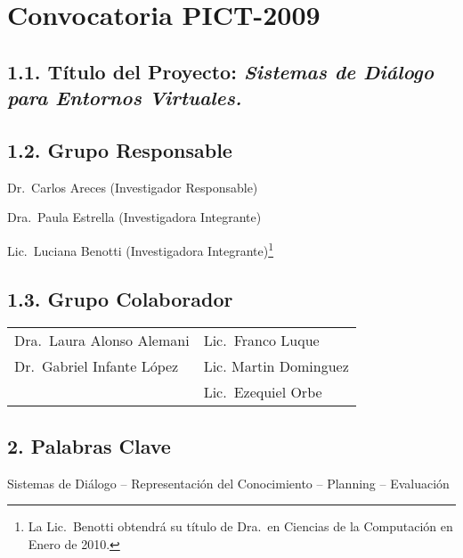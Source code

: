 \documentclass[11pt]{article}
\newcommand{\MySubSection}[1]{\vspace*{-.1\baselineskip}%
\subsection*{\sffamily\textbf
#1}\vspace*{-.2\baselineskip}}
\begin{document}
%
\thispagestyle{plain}



\section*{\sffamily\textbf{Convocatoria PICT-2009}}
\mbox{}

\vspace*{-.5\baselineskip}
\MySubSection{1.1. T\'itulo del Proyecto:
{\rm \emph{\Large Sistemas de Di\'alogo para Entornos Virtuales.}}}

\MySubSection{1.2. Grupo Responsable}

\hspace*{.5cm}
Dr.\ Carlos Areces (Investigador Responsable)

Dra.\ Paula Estrella (Investigadora Integrante)

Lic.\ Luciana Benotti (Investigadora Integrante)\footnote{La Lic.\ Benotti
obtendr\'a su t\'itulo de Dra.\ en Ciencias de la Computaci\'on en Enero de 2010.}

\MySubSection{1.3. Grupo Colaborador}

\hspace*{.5cm}
\begin{tabular}{@{}l@{\ \ \ \ \ \ \ \ \ \ }l}
Dra.\ Laura Alonso Alemani &

Lic.\ Franco Luque \\

Dr.\ Gabriel Infante L\'opez &

Lic. Martin Dominguez \\

& Lic.\ Ezequiel Orbe
\end{tabular}


\MySubSection{2.  Palabras Clave}

Sistemas de Di\'alogo -- Representaci\'on del Conocimiento -- Planning
-- Evaluaci\'on





\end{document}
